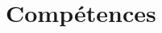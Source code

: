 \documentclass[12pt,a4paper,roman]{moderncv} %
\begin{document}

%


%


\section{Comp\'{e}tences}
\end{document}
